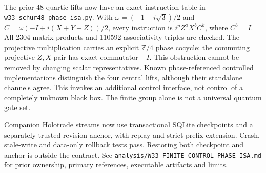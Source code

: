 The prior 48 quartic lifts now have an exact instruction table in
\texttt{w33\_schur48\_phase\_isa.py}. With
$\omega=(-1+i\sqrt3)/2$ and $C=\omega(-I+i(X+Y+Z))/2$,
every instruction is $i^p Z^aX^bC^k$, where $C^3=I$.
All 2304 matrix products and 110592 associativity triples are checked.
The projective multiplication carries an explicit $\mathbb Z/4$ phase
cocycle: the commuting projective $Z,X$ pair has exact commutator $-I$.
This obstruction cannot be removed by changing scalar representatives.
Known phase-referenced controlled implementations distinguish the four
central lifts, although their standalone channels agree. This invokes an
additional control interface, not control of a completely unknown black box.
The finite group alone is not a universal quantum gate set.

Companion Holotrade streams now use transactional SQLite checkpoints and a
separately trusted revision anchor, with replay and strict prefix extension.
Crash, stale-write and data-only rollback tests pass. Restoring both checkpoint
and anchor is outside the contract. See
\texttt{analysis/W33\_FINITE\_CONTROL\_PHASE\_ISA.md} for prior ownership,
primary references, executable artifacts and limits.
